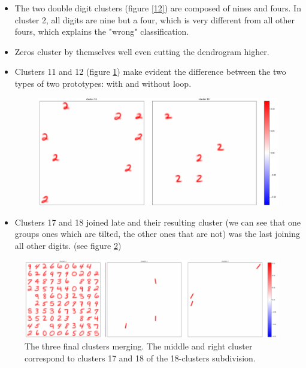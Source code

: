 \documentclass[a4paper]{report}
\begin{document}
\begin{itemize}
    \item The two double digit clusters (figure \ref{12}) are composed of nines and fours. In cluster 2, all digits are nine but a four, which is very different from all other fours, which explains the "wrong" classification.
    \item Zeros cluster by themselves well even cutting the dendrogram higher.

    \item Clusters 11 and 12 (figure \ref{1112}) make evident the difference between the two types of two prototypes: with and without loop.

\begin{figure} [H]
    \centering
    \includegraphics [width=\textwidth ] {c/h/11.png}
    \caption{}
    \label{1112}
\end{figure}

    \item Clusters 17 and 18 joined late and their resulting cluster (we can see that one groups ones which are tilted, the other ones that are not) was the last joining all other digits. (see figure \ref{final})
\end{itemize}

\begin{figure} [H]
    \centering
    \includegraphics  [width=\textwidth]  {c/h/final1.png}
    \caption{The three final clusters merging. The middle and right cluster correspond to clusters 17 and 18 of the 18-clusters subdivision.}
    \label{final}
\end{figure}
\end{document}
